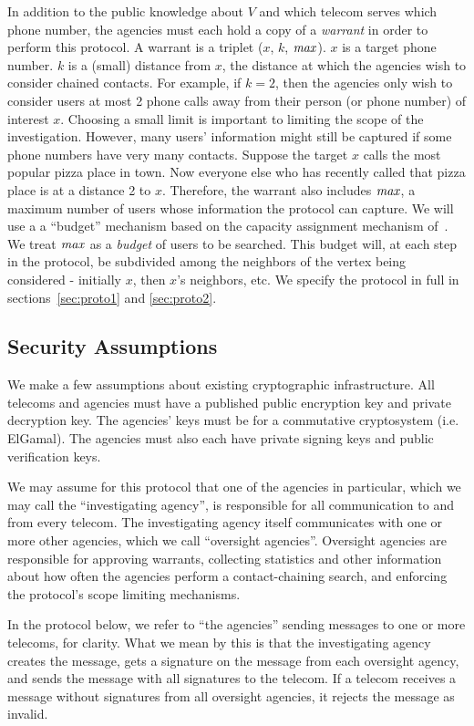 In addition to the public knowledge about $V$ and which telecom serves which phone number, the agencies must each hold a copy of a \emph{warrant} in order to perform this protocol. A warrant is a triplet ($x$, $k$, $\mathit{max}$). $x$ is a target phone number. $k$ is a (small) distance from $x$, the distance at which the agencies wish to consider chained contacts. For example, if $k=2$, then the agencies only wish to consider users at most 2 phone calls away from their person (or phone number) of interest $x$. Choosing a small limit is important to limiting the scope of the investigation. However, many users' information might still be captured if some phone numbers have very many contacts. Suppose the target $x$ calls the most popular pizza place in town. Now everyone else who has recently called that pizza place is at a distance 2 to $x$. Therefore, the warrant also includes $\mathit{max}$, a maximum number of users whose information the protocol can capture. We will use a a ``budget'' mechanism based on the capacity assignment mechanism of~\cite{tmls09}. We treat $\mathit{max}$ as a \emph{budget} of users to be searched. This budget will, at each step in the protocol, be subdivided among the neighbors of the vertex being considered - initially $x$, then $x$'s neighbors, etc. We specify the protocol in full in sections~\ref{sec:proto1} and \ref{sec:proto2}.

\subsection{Security Assumptions}

We make a few assumptions about existing cryptographic infrastructure. All telecoms and agencies must have a published public encryption key and private decryption key. The agencies' keys must be for a commutative cryptosystem (i.e. ElGamal). The agencies must also each have private signing keys and public verification keys.

We may assume for this protocol that one of the agencies in particular, which we may call the ``investigating agency'', is responsible for all communication to and from every telecom. The investigating agency itself communicates with one or more other agencies, which we call ``oversight agencies''. Oversight agencies are responsible for approving warrants, collecting statistics and other information about how often the agencies perform a contact-chaining search, and enforcing the protocol's scope limiting mechanisms. 

In the protocol below, we refer to ``the agencies'' sending messages to one or more telecoms, for clarity. What we mean by this is that the investigating agency creates the message, gets a signature on the message from each oversight agency, and sends the message with all signatures to the telecom. If a telecom receives a message without signatures from all oversight agencies, it rejects the message as invalid.

